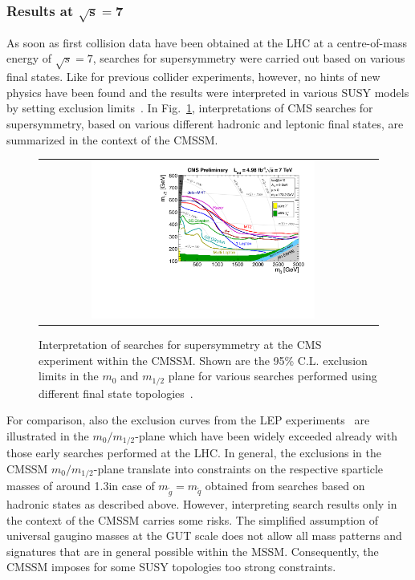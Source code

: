 \subsubsection*{Results at $\mathbf{\sqrt{s} = 7}$\tev}
\label{subsubsec:susy_7tev_results}
As soon as first collision data have been obtained at the LHC at a centre-of-mass energy of $\sqrt{s} = 7$\tev, searches for supersymmetry were carried out based on various final states. Like for previous collider experiments, however, no hints of new physics have been found and the results were interpreted in various SUSY models by setting exclusion limits~\cite{bib:ATLAS:PhysicsResultsSUS, bib:CMS:PhysicsResultsSUS}. In Fig.~\ref{fig:CMSSM_7TeV}, interpretations of CMS searches for supersymmetry, based on various different hadronic and leptonic final states, are summarized in the context of the CMSSM. 
\begin{figure}[!tp]
  \centering 
  \begin{tabular}{cc}
    \includegraphics[width=0.7\textwidth]{figures/CMS_SUSY_2011Limits5fb_tanb10.pdf} 
  \end{tabular}
  \caption{Interpretation of searches for supersymmetry at the CMS experiment within the CMSSM. Shown are the 95\% C.L. exclusion limits in the $m_0$ and $m_{1/2}$ plane for various searches performed using different final state topologies~\cite{bib:CMS:PhysicsResultsSUS}.}
  \label{fig:CMSSM_7TeV}
\end{figure}
For comparison, also the exclusion curves from the LEP experiments~\cite{LEPLimits} are illustrated in the $m_0/m_{1/2}$-plane which have been widely exceeded already with those early searches performed at the LHC. In general, the exclusions in the CMSSM $m_0/m_{1/2}$-plane translate into constraints on the respective sparticle masses of around 1.3\tev in case of $m_{\tilde{g}} = m_{\tilde{q}}$ obtained from searches based on hadronic states as described above. However, interpreting search results only in the context of the CMSSM carries some risks. The simplified assumption of universal gaugino masses at the GUT scale does not allow all mass patterns and signatures that are in general possible within the MSSM. Consequently, the CMSSM imposes for some SUSY topologies too strong constraints. \\
